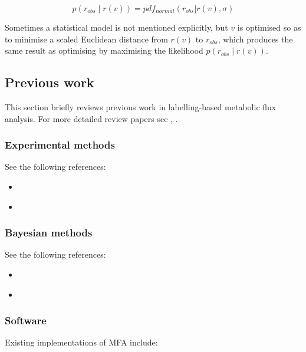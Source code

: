 \documentclass{article}
\def\tightlist{}
\begin{document}
\[
p(r_{obs}\mid r(v)) = pdf_{normal}(r_{obs} | r(v), \sigma)
\label{linear}
\]

Sometimes a statistical model is not mentioned explicitly, but \(v\) is
optimised so as to minimise a scaled Euclidean distance from \(r(v)\) to
\(r_{obs}\), which produces the same result as optimising by maximising
the likelihood \hyperref[linear]{\(p(r_{obs}\mid r(v))\)}.

\subsection{Previous work}\label{previous-work}

This section briefly reviews previous work in labelling-based metabolic
flux analysis. For more detailed review papers see
\citep{daiUnderstandingMetabolismFlux2017},
\citep{falcoMetabolicFluxAnalysis2022}.

\subsubsection{Experimental methods}\label{experimental-methods}

See the following references:

\begin{itemize}
\tightlist
\item
  \citep{longHighresolution13CMetabolic2019}
\item
  \citep{falcoMetabolicFluxAnalysis2022}
\end{itemize}

\subsubsection{Bayesian methods}\label{bayesian-methods}

See the following references:

\begin{itemize}
\tightlist
\item
  \citep{theorellBeCertainUncertainty2017}
\item
  \citep{theorellReversibleJumpMCMC2020}
\end{itemize}

\subsubsection{Software}\label{software}

Existing implementations of MFA include:
\end{document}
